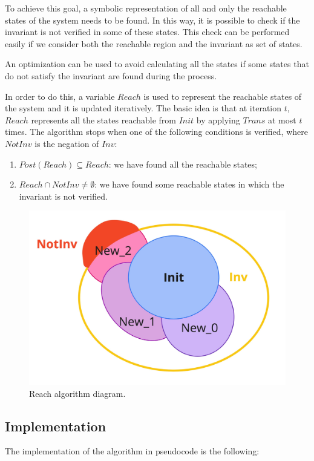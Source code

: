\documentclass[12pt]{article}
\begin{document}
    To achieve this goal, a symbolic representation of all and only the reachable states of the system needs to be found.
    In this way, it is possible to check if the invariant is not verified in some of these states.
    This check can be performed easily if we consider both the reachable region and the invariant as set of states.

    An optimization can be used to avoid calculating all the states if some states that do not satisfy the invariant are found during the process.

    In order to do this, a variable $Reach$ is used to represent the reachable states of the system and it is updated iteratively.
    The basic idea is that at iteration $t$, $Reach$ represents all the states reachable from $Init$ by applying $Trans$ at most $t$ times.
    The algorithm stops when one of the following conditions is verified, where $NotInv$ is the negation of $Inv$:
    \begin{enumerate}
        \item $Post(Reach) \subseteq Reach $: we have found all the reachable states;
        \item $Reach \cap NotInv \neq \emptyset$: we have found some reachable states in which the invariant is not verified.
    \end{enumerate}

    \begin{figure}[H] 
        \centering
        \includegraphics[width=\textwidth]{reach-diagram.png}
        \caption{Reach algorithm diagram.}
        \label{fig:reach_diagram}
    \end{figure}

    \subsection{Implementation}
    The implementation of the algorithm in pseudocode is the following:
\end{document}
